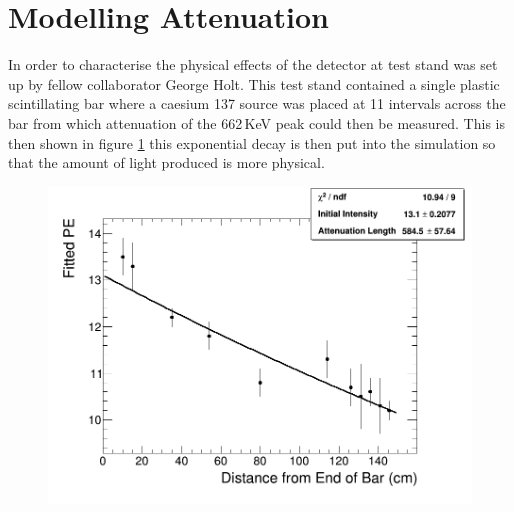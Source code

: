 \section{Modelling Attenuation}\label{sec:geant4Simulation_ModellingAttenuation}
In order to characterise the physical effects of the detector at test stand was set up by fellow collaborator George Holt. This test stand contained a single plastic scintillating bar where a caesium 137 source was placed at 11 intervals across the bar from which attenuation of the 662\,KeV peak could then be measured. This is then shown in figure \ref{fig:attenuationPlot} this exponential decay is then put into the simulation so that the amount of light produced is more physical. 
\begin{figure}[H]
 \centering
 \includegraphics[width=1.0\linewidth]{result_from_attnPlotter.png} 
 \label{fig:attenuationPlot}
\end{figure}

